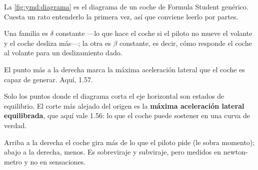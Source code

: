 La \cref{fig:ymd:diagrama} es el diagrama de un coche de Formula Student
genérico. Cuesta un rato entenderlo la primera vez, así que conviene leerlo por
partes.

\begin{description}[leftmargin=0pt,labelsep=0pt,style=nextline]
  \item[Las dos familias de líneas] Una familia es $\delta$ constante ---lo que
    hace el coche si el piloto no mueve el volante y el coche desliza más---; la
    otra es $\beta$ constante, es decir, cómo responde el coche al volante para
    un deslizamiento dado.
  \item[El eje horizontal: agarre] El punto más a la derecha marca la máxima
    aceleración lateral que el coche es capaz de generar. Aquí,
    \SI{1.57}{\gacc}.
  \item[La línea $N = 0$: lo sostenible] Solo los puntos donde el diagrama corta
    el eje horizontal son estados de equilibrio. El corte más alejado del origen
    es la \textbf{máxima aceleración lateral equilibrada}, que aquí vale
    \SI{1.56}{\gacc}: lo que el coche puede sostener en una curva de verdad.
  \item[Los cuatro cuadrantes] Arriba a la derecha el coche gira más de lo que
    el piloto pide (le sobra momento); abajo a la derecha, menos. Es
    sobreviraje y subviraje, pero medidos en newton-metro y no en sensaciones.
\end{description}

